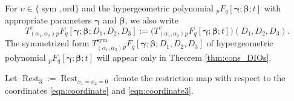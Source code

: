 \documentclass[a4paper,11pt,reqno]{amsart}
\newcommand{\0}{{\bf 0}}
\newcommand{\1}{{\bf 1}}
\newcommand{\ord}{{\mathrm{ord}}}
\DeclareMathOperator{\Rest}{Rest}
\DeclareMathOperator{\sym}{sym}
\theoremstyle{plain}
\theoremstyle{definition}
\numberwithin{equation}{section}
\theoremstyle{definition}
\begin{document}
For 
$\upsilon \in \{\sym, \ord\}$ and 
the hypergeometric polynomial
${}_pF_q[\pmb{\gamma};\pmb{\beta};t]$ with appropriate parameters $\pmb{\gamma}$ and $\pmb{\beta}$, 
we also write
\begin{equation}\label{eqn:Tupsilon}
T^\upsilon_{(\alpha_1,\alpha_2)}{}_pF_q[\pmb{\gamma};\pmb{\beta};D_1, D_2, D_3]
:=\big(T^\upsilon_{(\alpha_1,\alpha_2)}{}_pF_q[\pmb{\gamma};\pmb{\beta};t]\big)(D_1, D_2, D_3).
\end{equation}
The symmetrized form
$T^{\sym}_{(\alpha_1,\alpha_2)}{}_pF_q[\pmb{\gamma};\pmb{\beta};D_1, D_2, D_3]$
of hypergeometric polynomial ${}_pF_q[\pmb{\gamma};\pmb{\beta};t]$
will appear only in Theorem \ref{thm:cons_DIOs}.

Let $\Rest_3:=\Rest_{x_1=x_2=0}$ denote
the restriction map with respect to the coordinates
\eqref{eqn:coordinate} and  \eqref{eqn:coordinate3}.
\end{document}
